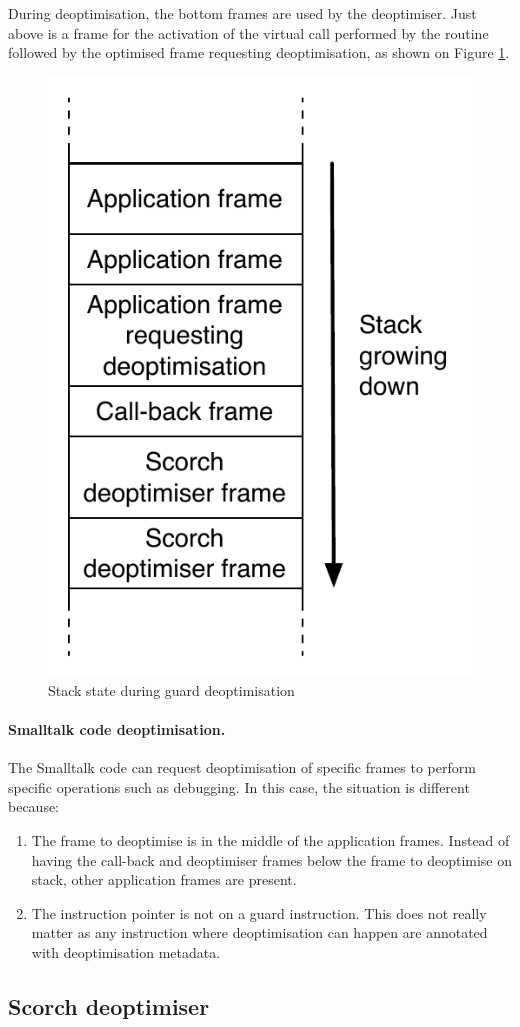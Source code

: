 \documentclass[a4paper,12pt,twoside]{../includes/ThesisStyle}
\begin{document}
During deoptimisation, the bottom frames are used by the deoptimiser. Just above is a frame for the activation of the virtual call performed by the routine followed by the optimised frame requesting deoptimisation, as shown on Figure \ref{fig:DeoptCallBackStack}.

\begin{figure}[h!]
    \begin{center}
        \includegraphics[width=0.4\linewidth]{DeoptCallBackStack}
        \caption{Stack state during guard deoptimisation}
        \label{fig:DeoptCallBackStack}
    \end{center}
\end{figure}


\paragraph{Smalltalk code deoptimisation.}The Smalltalk code can request deoptimisation of specific frames to perform specific operations such as debugging. In this case, the situation is different because:
\begin{enumerate}
	\item The frame to deoptimise is in the middle of the application frames. Instead of having the call-back and deoptimiser frames below the frame to deoptimise on stack, other application frames are present.
	\item The instruction pointer is not on a guard instruction. This does not really matter as any instruction where deoptimisation can happen are annotated with deoptimisation metadata.
\end{enumerate}

\subsection{Scorch deoptimiser}
\end{document}
